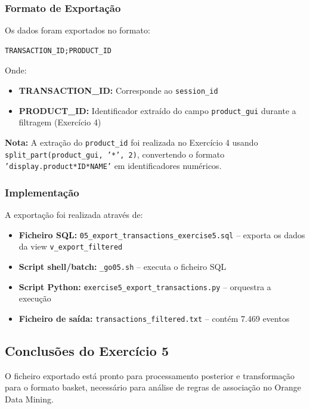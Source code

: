 \documentclass[11pt,a4paper]{article}
\begin{document}
\subsubsection{Formato de Exportação}

Os dados foram exportados no formato:
\begin{verbatim}
TRANSACTION_ID;PRODUCT_ID
\end{verbatim}

Onde:
\begin{itemize}
    \item \textbf{TRANSACTION\_ID:} Corresponde ao \texttt{session\_id}
    \item \textbf{PRODUCT\_ID:} Identificador extraído do campo \texttt{product\_gui} durante a filtragem (Exercício 4)
\end{itemize}

\textbf{Nota:} A extração do \texttt{product\_id} foi realizada no Exercício 4 usando \texttt{split\_part(product\_gui, '*', 2)}, convertendo o formato \texttt{'display.product*ID*NAME'} em identificadores numéricos.

\subsubsection{Implementação}

A exportação foi realizada através de:
\begin{itemize}
    \item \textbf{Ficheiro SQL:} \texttt{05\_export\_transactions\_exercise5.sql} -- exporta os dados da view \texttt{v\_export\_filtered}
    \item \textbf{Script shell/batch:} \texttt{\_go05.sh} -- executa o ficheiro SQL
    \item \textbf{Script Python:} \texttt{exercise5\_export\_transactions.py} -- orquestra a execução
    \item \textbf{Ficheiro de saída:} \texttt{transactions\_filtered.txt} -- contém 7.469 eventos
\end{itemize}

\subsection{Conclusões do Exercício 5}

O ficheiro exportado está pronto para processamento posterior e transformação para o formato basket, necessário para análise de regras de associação no Orange Data Mining.
\end{document}

